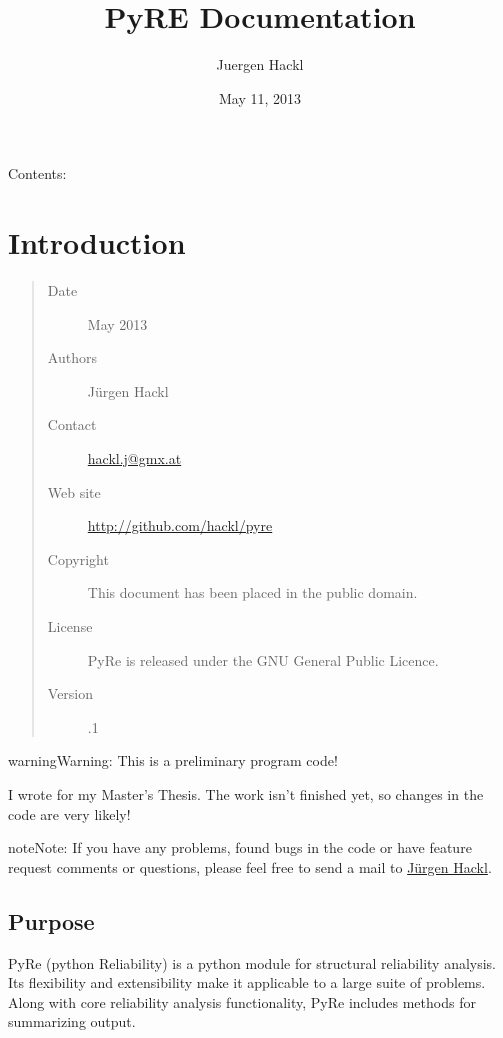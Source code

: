 \documentclass[letterpaper,10pt,english]{sphinxmanual}
\title{PyRE Documentation}
\date{May 11, 2013}
\author{Juergen Hackl}
\begin{document}
\maketitle
\tableofcontents
{}\label{index::doc}


Contents:


\chapter{Introduction}
\label{README:introduction}\label{README:pyre-documentation}\label{README::doc}\begin{quote}\begin{description}
\item[{Date}]  May 2013

\item[{Authors}] \leavevmode
Jürgen Hackl

\item[{Contact}] \leavevmode
\href{mailto:hackl.j@gmx.at}{hackl.j@gmx.at}

\item[{Web site}] \leavevmode
\href{http://github.com/hackl/pyre}{http://github.com/hackl/pyre}

\item[{Copyright}] \leavevmode
This document has been placed in the public domain.

\item[{License}] \leavevmode
PyRe is released under the GNU General Public Licence.

\item[{Version}] .1

\end{description}\end{quote}

\begin{notice}{warning}{Warning:}
This is a preliminary program code!

I wrote  for my Master's Thesis.
The work isn't finished yet, so changes in the code are very likely!
\end{notice}

\begin{notice}{note}{Note:}
If you have any problems, found bugs in the code or have feature request
comments or questions, please feel free to send a mail to \href{mailto:hackl.j@gmx.at}{Jürgen Hackl}.
\end{notice}


\section{Purpose}
\label{README:jurgen-hackl}\label{README:purpose}
PyRe (python Reliability) is a python module for structural reliability
analysis. Its flexibility and extensibility make it applicable to a large
suite of problems. Along with core reliability analysis functionality, PyRe
includes methods for summarizing output.
\end{document}
